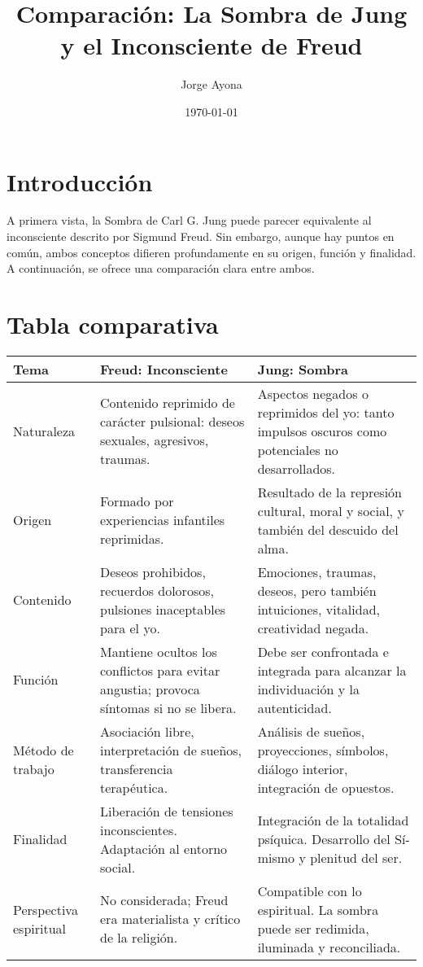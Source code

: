 \documentclass[12pt]{article}
\title{Comparación: La Sombra de Jung y el Inconsciente de Freud}
\author{Jorge Ayona}
\date{\today}
\begin{document}
\maketitle

\section*{Introducción}

A primera vista, la Sombra de Carl G. Jung puede parecer equivalente al inconsciente descrito por Sigmund Freud. Sin embargo, aunque hay puntos en común, ambos conceptos difieren profundamente en su origen, función y finalidad. A continuación, se ofrece una comparación clara entre ambos.

\section*{Tabla comparativa}

\begin{tabularx}{\textwidth}{>{\raggedright\arraybackslash}p{3cm} 
>{\raggedright\arraybackslash}X 
>{\raggedright\arraybackslash}X}
\toprule
\textbf{Tema} & \textbf{Freud: Inconsciente} & \textbf{Jung: Sombra} \\
\midrule

Naturaleza & 
Contenido reprimido de carácter pulsional: deseos sexuales, agresivos, traumas. & 
Aspectos negados o reprimidos del yo: tanto impulsos oscuros como potenciales no desarrollados. \\

Origen & 
Formado por experiencias infantiles reprimidas. & 
Resultado de la represión cultural, moral y social, y también del descuido del alma. \\

Contenido & 
Deseos prohibidos, recuerdos dolorosos, pulsiones inaceptables para el yo. & 
Emociones, traumas, deseos, pero también intuiciones, vitalidad, creatividad negada. \\

Función & 
Mantiene ocultos los conflictos para evitar angustia; provoca síntomas si no se libera. & 
Debe ser confrontada e integrada para alcanzar la individuación y la autenticidad. \\

Método de trabajo & 
Asociación libre, interpretación de sueños, transferencia terapéutica. & 
Análisis de sueños, proyecciones, símbolos, diálogo interior, integración de opuestos. \\

Finalidad & 
Liberación de tensiones inconscientes. Adaptación al entorno social. & 
Integración de la totalidad psíquica. Desarrollo del Sí-mismo y plenitud del ser. \\

Perspectiva espiritual & 
No considerada; Freud era materialista y crítico de la religión. & 
Compatible con lo espiritual. La sombra puede ser redimida, iluminada y reconciliada. \\

\bottomrule
\end{tabularx}
\end{document}
